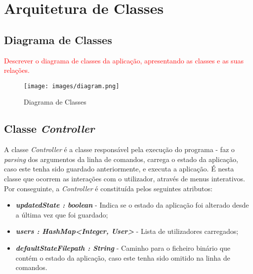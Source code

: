 \documentclass[a4paper,12pt]{scrreprt}
\begin{document}
\tableofcontents

\pagebreak

%
%
%




\chapter{Arquitetura de Classes}
\section{Diagrama de Classes}
\textcolor{red}{
    Descrever o diagrama de classes da aplicação, apresentando as classes e as suas relações.
}


\begin{figure}[!ht]
    \centering
    \texttt{[image: images/diagram.png]}
    \caption{Diagrama de Classes}
    \label{fig:diagrama-classes}
\end{figure}


\section{Classe \textit{Controller}}
    A classe \textit{Controller} é a classe responsável pela execução do programa - faz o \textit{parsing} dos argumentos da linha de comandos, carrega o estado da aplicação, caso este tenha sido guardado anteriormente, e executa a aplicação.
    É nesta classe que ocorrem as interações com o utilizador, através de menus interativos.
    Por conseguinte, a \textit{Controller} é constituída pelos seguintes atributos:

    \begin{itemize}
        \item \textit{\textbf{updatedState : boolean}} - Indica se o estado da aplicação foi alterado desde a última vez que foi guardado;
        \item \textit{\textbf{users : HashMap<Integer, User>}} - Lista de utilizadores carregados;
        \item \textit{\textbf{defaultStateFilepath : String}} - Caminho para o ficheiro binário que contém o estado da aplicação, caso este tenha sido omitido na linha de comandos.
    \end{itemize}
\end{document}

